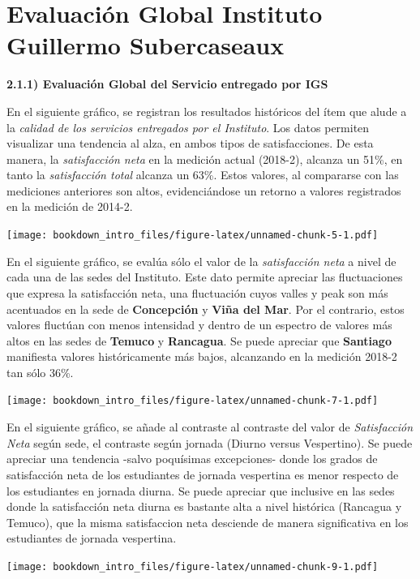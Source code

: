 \documentclass[]{book}
\begin{document}
\section{Evaluación Global Instituto Guillermo
Subercaseaux}\label{evaluacion-global-instituto-guillermo-subercaseaux}

\textbf{2.1.1) Evaluación Global del Servicio entregado por IGS}

En el siguiente gráfico, se registran los resultados históricos del ítem
que alude a la \emph{calidad de los servicios entregados por el
Instituto}. Los datos permiten visualizar una tendencia al alza, en
ambos tipos de satisfacciones. De esta manera, la \emph{satisfacción
neta} en la medición actual (2018-2), alcanza un 51\%, en tanto la
\emph{satisfacción total} alcanza un 63\%. Estos valores, al compararse
con las mediciones anteriores son altos, evidenciándose un retorno a
valores registrados en la medición de 2014-2.

\texttt{[image: bookdown\_intro\_files/figure-latex/unnamed-chunk-5-1.pdf]}

En el siguiente gráfico, se evalúa sólo el valor de la
\emph{satisfacción neta} a nivel de cada una de las sedes del Instituto.
Este dato permite apreciar las fluctuaciones que expresa la satisfacción
neta, una fluctuación cuyos valles y peak son más acentuados en la sede
de \textbf{Concepción} y \textbf{Viña del Mar}. Por el contrario, estos
valores fluctúan con menos intensidad y dentro de un espectro de valores
más altos en las sedes de \textbf{Temuco} y \textbf{Rancagua}. Se puede
apreciar que \textbf{Santiago} manifiesta valores históricamente más
bajos, alcanzando en la medición 2018-2 tan sólo 36\%.

\texttt{[image: bookdown\_intro\_files/figure-latex/unnamed-chunk-7-1.pdf]}

En el siguiente gráfico, se añade al contraste al contraste del valor de
\emph{Satisfacción Neta} según sede, el contraste según jornada (Diurno
versus Vespertino). Se puede apreciar una tendencia -salvo poquísimas
excepciones- donde los grados de satisfacción neta de los estudiantes de
jornada vespertina es menor respecto de los estudiantes en jornada
diurna. Se puede apreciar que inclusive en las sedes donde la
satisfacción neta diurna es bastante alta a nivel histórica (Rancagua y
Temuco), que la misma satisfaccion neta desciende de manera
significativa en los estudiantes de jornada vespertina.

\texttt{[image: bookdown\_intro\_files/figure-latex/unnamed-chunk-9-1.pdf]}
\end{document}
